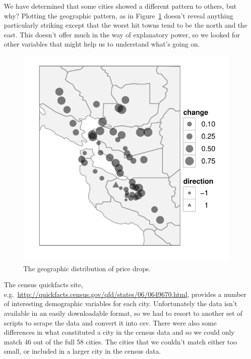\documentclass[oneside]{article}
\begin{document}
We have determined that some cities showed a different pattern to others, but why? Plotting the geographic pattern, as in Figure~\ref{fig:geo} doesn't reveal anything particularly striking except that the worst hit towns tend to be the north and the east. This doesn't offer much in the way of explanatory power, so we looked for other variables that might help us to understand what's going on. 

\begin{figure}[htbp]
  \centering
    \includegraphics[width=0.5\linewidth]{cities-geo-changes}
  \caption{The geographic distribution of price drops.}
  \label{fig:geo}
\end{figure}

The census quickfacts site, e.g.\ \url{http://quickfacts.census.gov/qfd/states/06/0649670.html}, provides a number of interesting demographic variables for each city.  Unfortunately the data isn't available in an easily downloadable format, so we had to resort to another set of scripts to scrape the data and convert it into csv.  There were also some differences in what constituted a city in the census data and so we could only match 46 out of the full 58 cities.  The cities that we couldn't match either too small, or included in a larger city in the census data.
\end{document}
